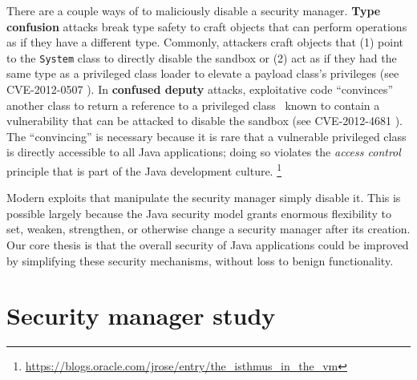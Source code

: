 \documentclass{sig-alternate}
\begin{document}
There are a couple ways of to maliciously disable a security manager.
\textbf{Type confusion} attacks break type
safety to craft objects that can perform operations as if they have
a different type.  Commonly, attackers craft objects that (1) point to the \texttt{System} class to directly disable the sandbox or (2) act as if they had
the same type as a privileged class loader to elevate a payload class's privileges (see CVE-2012-0507 \cite{_vulnerability_2012_0507}). In \textbf{confused deputy} attacks,
exploitative code ``convinces'' another 
class to return a reference to a privileged class~\cite{hardy_confused_1988}
known to contain a vulnerability that can be attacked to disable the sandbox 
(see CVE-2012-4681 \cite{_vulnerability_2012_4681}).
The ``convincing'' is necessary
because it is rare that a vulnerable privileged class is directly accessible
to all Java applications; doing so violates the \textit{access
control} principle that is part of the Java development culture.%
\footnote{\url{https://blogs.oracle.com/jrose/entry/the_isthmus_in_the_vm}%
} 

%
  
Modern exploits that manipulate the security manager simply disable it.  This is possible largely because the Java security model
grants enormous flexibility to
set, weaken, strengthen, or otherwise change a security
manager after its creation.
Our core thesis is that the overall security of Java applications could be improved by
simplifying these security mechanisms, without loss to benign functionality.

\section{Security manager study}\label{sec:Security-Manager-Study}
\end{document}
